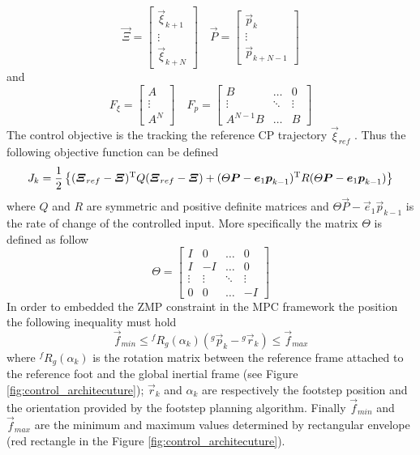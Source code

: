 \[
\vec{\Xi} =
\begin{bmatrix}
  \vec{\xi}_{k+1}\\
  \vdots\\
  \vec{\xi}_{k+N}
\end{bmatrix} \quad
\vec{P} =
\begin{bmatrix}
  \vec{p}_{k}\\
  \vdots\\
  \vec{p}_{k+N-1}
\end{bmatrix}
\]
and
\[
F_{\xi} =
\begin{bmatrix}
  A\\
  \vdots\\
  A^N
\end{bmatrix} \quad
F_p =
\begin{bmatrix}
  B & \hdots & 0\\
  \vdots &\ddots & \vdots\\
  A^{N-1} B & \hdots & B
\end{bmatrix}
\]
The control objective is the tracking the reference CP trajectory $\vec{\xi}_{ref}$ .
Thus the following objective function can be defined
\[
J_k = \frac{1}{2} \left\{  (\boldsymbol{\Xi}_{ref} - \boldsymbol{\Xi})^{\mathrm{T}} Q (\boldsymbol{\Xi}_{ref} - \boldsymbol{\Xi}) +
(\Theta \boldsymbol{P} - \boldsymbol{e}_1 \boldsymbol{p}_{k-1}) ^{\mathrm{T}} R (\Theta \boldsymbol{P} - \boldsymbol{e}_1 \boldsymbol{p}_{k-1}) \right\}
\]
where $Q$ and $R$ are symmetric and positive definite matrices and $\Theta \vec{P} - \vec{e}_1 \vec{p}_{k-1}$ is the rate of change of the controlled input. More specifically the matrix $\Theta$ is
defined as follow
\[
\Theta =
\begin{bmatrix}
  I & 0 & \hdots & 0 \\
  I & -I & \hdots & 0 \\
  \vdots & \vdots & \ddots & \vdots \\
  0 & 0 & \hdots & -I
\end{bmatrix}
\]
In order to embedded the ZMP constraint in the MPC framework the position the following inequality
must hold
\[
\vec{f}_{min} \le {}^f R_g(\alpha_k) ({}^g \vec{p}_k - {}^ g \vec{r}_k) \le \vec{f}_{max}
\]
where ${}^f R_g(\alpha_k)$ is the rotation matrix between the reference frame attached to the
reference foot and the global inertial frame (see Figure \ref{fig:control_architecuture});
$\vec{r}_k$ and $\alpha_k$ are respectively the footstep position and the orientation provided
by the footstep planning algorithm. Finally $\vec{f}_{min}$ and $\vec{f}_{max}$ are the minimum and
maximum values determined by rectangular envelope (red rectangle in the Figure \ref{fig:control_architecuture}).
